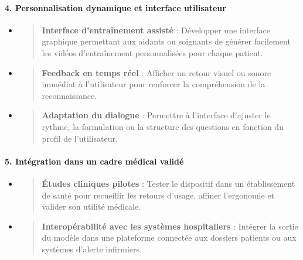 \documentclass[
]{article}
\begin{document}
\hypertarget{personnalisation-dynamique-et-interface-utilisateur}{%
\paragraph{\texorpdfstring{\textbf{4. Personnalisation dynamique et interface utilisateur}}{4. Personnalisation dynamique et interface utilisateur}}\label{personnalisation-dynamique-et-interface-utilisateur}}

\begin{itemize}
\item
  \begin{quote}
  \textbf{Interface d'entraînement assisté} : Développer une interface graphique permettant aux aidants ou soignants de générer facilement les vidéos d'entraînement personnalisées pour chaque patient.
  \end{quote}
\item
  \begin{quote}
  \textbf{Feedback en temps réel} : Afficher un retour visuel ou sonore immédiat à l'utilisateur pour renforcer la compréhension de la reconnaissance.
  \end{quote}
\item
  \begin{quote}
  \textbf{Adaptation du dialogue} : Permettre à l'interface d'ajuster le rythme, la formulation ou la structure des questions en fonction du profil de l'utilisateur.
  \end{quote}
\end{itemize}

\hypertarget{intuxe9gration-dans-un-cadre-muxe9dical-validuxe9}{%
\paragraph{\texorpdfstring{\textbf{5. Intégration dans un cadre médical validé}}{5. Intégration dans un cadre médical validé}}\label{intuxe9gration-dans-un-cadre-muxe9dical-validuxe9}}

\begin{itemize}
\item
  \begin{quote}
  \textbf{Études cliniques pilotes} : Tester le dispositif dans un établissement de santé pour recueillir les retours d'usage, affiner l'ergonomie et valider son utilité médicale.
  \end{quote}
\item
  \begin{quote}
  \textbf{Interopérabilité avec les systèmes hospitaliers} : Intégrer la sortie du modèle dans une plateforme connectée aux dossiers patients ou aux systèmes d'alerte infirmiers.
  \end{quote}
\end{itemize}
\end{document}
